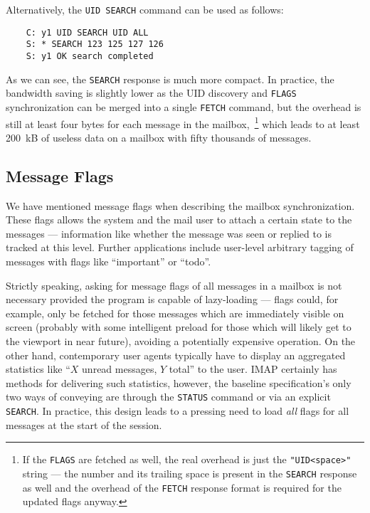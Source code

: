 \documentclass[trojita]{subfiles}
\begin{document}
Alternatively, the {\tt UID SEARCH} command can be used as follows:

\begin{verbatim}
    C: y1 UID SEARCH UID ALL
    S: * SEARCH 123 125 127 126
    S: y1 OK search completed
\end{verbatim}

As we can see, the {\tt SEARCH} response is much more compact.  In practice, the bandwidth saving is slightly lower as
the UID discovery and {\tt FLAGS} synchronization can be merged into a single {\tt FETCH} command, but the overhead is
still at least four bytes for each message in the mailbox,~\footnote{If the {\tt FLAGS} are fetched as well, the real
overhead is just the {\tt "UID<space>"} string --- the number and its trailing space is present in the {\tt SEARCH}
response as well and the overhead of the {\tt FETCH} response format is required for the updated flags anyway.} which
leads to at least 200~kB of useless data on a mailbox with fifty thousands of messages.

\subsection{Message Flags}

We have mentioned message flags when describing the mailbox synchronization.  These flags allows the system and the mail
user to attach a certain state to the messages --- information like whether the message was seen or replied to is tracked
at this level.  Further applications include user-level arbitrary tagging of messages with flags like ``important'' or
``todo''.

Strictly speaking, asking for message flags of all messages in a mailbox is not necessary provided the program is
capable of lazy-loading --- flags could, for example, only be fetched for those messages which are immediately visible on
screen (probably with some intelligent preload for those which will likely get to the viewport in near future), avoiding
a potentially expensive operation.  On the other hand, contemporary user agents typically have to display an aggregated
statistics like ``$X$ unread messages, $Y$ total'' to the user.  IMAP certainly has methods for delivering such
statistics, however, the baseline specification's only two ways of conveying are through the {\tt STATUS} command or via
an explicit {\tt SEARCH}.  In practice, this design leads to a pressing need to load {\em all} flags for all messages at
the start of the session.
\end{document}
